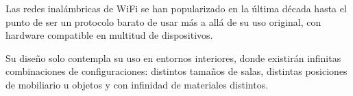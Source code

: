 







Las redes inalámbricas de WiFi se han popularizado en la última década hasta el punto de ser un protocolo barato de usar más a allá de su uso original, con hardware compatible en multitud de dispositivos.

Su diseño solo contempla su uso en entornos interiores, donde existirán infinitas combinaciones de configuraciones: distintos tamaños de salas, distintas posiciones de mobiliario u objetos y con infinidad de materiales distintos.

